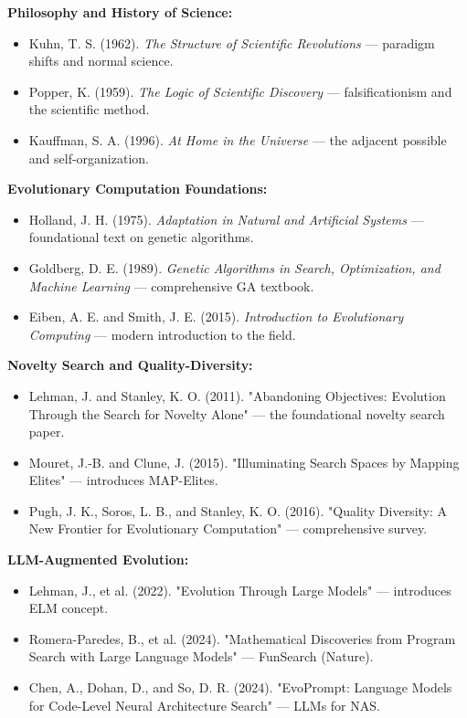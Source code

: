 \textbf{Philosophy and History of Science:}
\begin{itemize}
\item Kuhn, T. S. (1962). \textit{The Structure of Scientific Revolutions} --- paradigm shifts and normal science.
\item Popper, K. (1959). \textit{The Logic of Scientific Discovery} --- falsificationism and the scientific method.
\item Kauffman, S. A. (1996). \textit{At Home in the Universe} --- the adjacent possible and self-organization.
\end{itemize}

\textbf{Evolutionary Computation Foundations:}
\begin{itemize}
\item Holland, J. H. (1975). \textit{Adaptation in Natural and Artificial Systems} --- foundational text on genetic algorithms.
\item Goldberg, D. E. (1989). \textit{Genetic Algorithms in Search, Optimization, and Machine Learning} --- comprehensive GA textbook.
\item Eiben, A. E. and Smith, J. E. (2015). \textit{Introduction to Evolutionary Computing} --- modern introduction to the field.
\end{itemize}

\textbf{Novelty Search and Quality-Diversity:}
\begin{itemize}
\item Lehman, J. and Stanley, K. O. (2011). "Abandoning Objectives: Evolution Through the Search for Novelty Alone" --- the foundational novelty search paper.
\item Mouret, J.-B. and Clune, J. (2015). "Illuminating Search Spaces by Mapping Elites" --- introduces MAP-Elites.
\item Pugh, J. K., Soros, L. B., and Stanley, K. O. (2016). "Quality Diversity: A New Frontier for Evolutionary Computation" --- comprehensive survey.
\end{itemize}

\textbf{LLM-Augmented Evolution:}
\begin{itemize}
\item Lehman, J., et al. (2022). "Evolution Through Large Models" --- introduces ELM concept.
\item Romera-Paredes, B., et al. (2024). "Mathematical Discoveries from Program Search with Large Language Models" --- FunSearch (Nature).
\item Chen, A., Dohan, D., and So, D. R. (2024). "EvoPrompt: Language Models for Code-Level Neural Architecture Search" --- LLMs for NAS.
\end{itemize}

